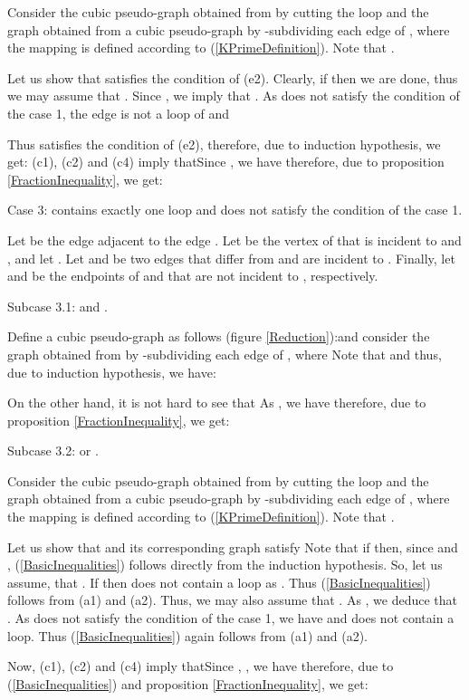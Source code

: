 \documentclass[fleqn,12pt,twoside]{article}
\newenvironment{proof}[1][Proof.]{\begin{trivlist}
\item[\hskip \labelsep {\bfseries #1}]}{\end{trivlist}}
\begin{document}
\begin{proof}
Consider the cubic pseudo-graph  obtained from
 by cutting the loop  and the graph  obtained
from a cubic pseudo-graph  by -subdividing each edge  of
, where the mapping  is defined
according to (\ref{KPrimeDefinition}). Note that .

Let us show that  satisfies the condition of (e2).
Clearly, if  then we are done, thus we may assume that . Since , we imply that . As  does not satisfy the condition of the
case 1, the edge  is not a loop of  and

Thus  satisfies the condition of (e2), therefore,
due to induction hypothesis, we get:
(c1), (c2) and (c4) imply thatSince ,  we have
therefore, due to proposition \ref{FractionInequality}, we get:


Case 3:  contains exactly one loop  and does not satisfy
the condition of the case 1.

Let  be the edge adjacent to the edge . Let  be the vertex of  that is incident to  and , and let .
Let 
and  be two edges that differ from  and are incident to . Finally, let  and  be the endpoints of  and
 that are not incident to , respectively.

Subcase 3.1:  and .

Define a cubic pseudo-graph  as follows (figure \ref {Reduction}):and consider the graph  obtained from  by -subdividing each edge  of , where
Note that  and 
thus, due to induction hypothesis, we have:

On the other hand, it is not hard to see that
As , we have
therefore, due to proposition \ref{FractionInequality}, we get:

Subcase 3.2:  or .

Consider the cubic pseudo-graph  obtained from
 by cutting the loop  and the graph  obtained
from a cubic pseudo-graph  by -subdividing each edge  of
, where the mapping  is defined
according to (\ref{KPrimeDefinition}). Note that .

Let us show that  and its corresponding graph
 satisfy
Note that if  then, since  and , (\ref{BasicInequalities}) follows
directly from the induction hypothesis. So, let us assume, that
. If  then  does not
contain a loop as . Thus (\ref{BasicInequalities}) follows
from (a1) and (a2). Thus, we may also assume that . As
, we deduce that .
As  does not satisfy the condition of the case 1, we have
 and  does not contain a loop. Thus
(\ref{BasicInequalities}) again follows from (a1) and (a2).

Now, (c1), (c2) and (c4) imply thatSince , , we have
therefore, due to (\ref{BasicInequalities}) and proposition \ref {FractionInequality}, we get:



\end{proof}
\end{document}
